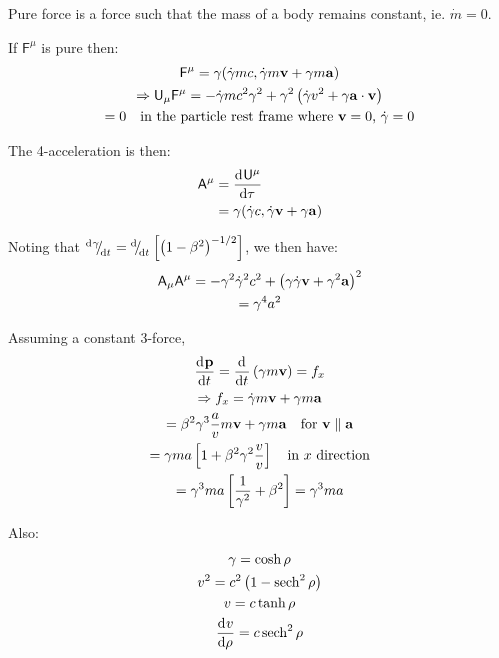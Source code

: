 \begin{parts}
	Pure force is a force such that the mass of a body remains constant, ie. $\dot{m}=0$.
	
	If $\mathsf{F}^\mu$ is pure then:
	\begin{gather*}
		\mathsf{F}^\mu = \gamma (
		\dot{\gamma}mc,
		\dot{\gamma}m\mathbf{v} + \gamma m \mathbf{a}
		) \\
		\Rightarrow \mathsf{U}_\mu \mathsf{F}^\mu = -\dot{\gamma}mc^2 \gamma^2 + \gamma^2 \left(\dot{\gamma}v^2 + \gamma \mathbf{a}\cdot\mathbf{v}\right) \\
		= 0 \textnormal{\hspace{1em}in the particle rest frame where $\mathbf{v}=0$, $\dot{\gamma}=0$}
	\end{gather*}
	
	The 4-acceleration is then:
	\begin{align*}
		\mathsf{A}^\mu &= \frac{\mathrm{d}^{}{\mathsf{U}^\mu}}{\mathrm{d}{\tau}^{}} \\
		&= \gamma (\dot{\gamma}c, \dot{\gamma}\mathbf{v} + \gamma\mathbf{a})
	\end{align*}
	
	Noting that ${{}^{\mathrm{d}^{}{\gamma}}{\mskip -5mu/\mskip -3mu}_{\mathrm{d}{t}^{}}} = {{}^{\mathrm{d}^{}}{\mskip -5mu/\mskip -3mu}_{\mathrm{d}{t}^{}}}\left[\left(1-\beta^2\right)^{-1/2}\right]$, we then have:
	\begin{gather*}
		\mathsf{A}_\mu \mathsf{A}^\mu = -\gamma^2 \dot{\gamma}^2 c^2 + \left(\gamma\dot{\gamma}\mathbf{v} + \gamma^2 \mathbf{a}\right)^2 \\
		= \gamma^4 a^2
	\end{gather*}
	
	Assuming a constant 3-force,
	\begin{gather*}
		\frac{\mathrm{d}^{}{\mathbf{p}}}{\mathrm{d}{t}^{}} = \frac{\mathrm{d}^{}}{\mathrm{d}{t}^{}}\left(\gamma m \mathbf{v}\right) = f_x \\
		\Rightarrow f_x = \dot{\gamma}m\mathbf{v} + \gamma m \mathbf{a} \\
		= \beta^2 \gamma^3 \frac{a}{v} m \mathbf{v} + \gamma m \mathbf{a} \textnormal{\hspace{1em}for $\mathbf{v} \parallel \mathbf{a}$} \\
		= \gamma ma \left[1 + \beta^2 \gamma^2 \frac{v}{v}\right] \textnormal{\hspace{1em}in $x$ direction} \\
		= \gamma^3 ma \left[\frac{1}{\gamma^2} + \beta^2\right]
		= \gamma^3 ma
	\end{gather*}
	
	Also:
	\begin{gather*}
		\gamma = \cosh\rho \\
		v^2 = c^2 \left(1 - \operatorname{sech}^2 \rho\right) \\
		v = c \tanh\rho \\
		\frac{\mathrm{d}^{}{v}}{\mathrm{d}{\rho}^{}} = c \operatorname{sech}^2 \rho
	\end{gather*}
	

\end{parts}
